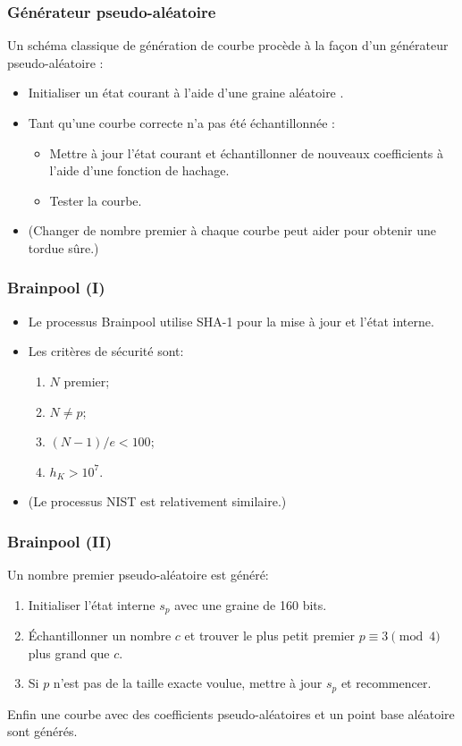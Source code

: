 \documentclass[francais]{beamer}
\begin{document}
\begin{frame}\frametitle{Générateur pseudo-aléatoire}
Un schéma classique de génération de courbe procède à la façon d'un générateur pseudo-aléatoire :
\begin{itemize}
\item Initialiser un état courant à l'aide d'une graine \og aléatoire \fg.
\item Tant qu'une courbe correcte n'a pas été échantillonnée :
\begin{itemize}
\item Mettre à jour l'état courant et échantillonner de nouveaux coefficients à l'aide d'une fonction de hachage.
\item Tester la courbe.
\end{itemize}
\item (Changer de nombre premier à chaque courbe peut aider pour obtenir une tordue sûre.)
\end{itemize}
\end{frame}

\begin{frame}\frametitle{Brainpool (I)}

\begin{itemize}
\item Le processus Brainpool utilise SHA-1 pour la mise à jour et l'état interne.

\bigskip

\item Les critères de sécurité sont:
\begin{enumerate}
\item $N$ premier;
\item $N \neq p$;
\item $(N-1)/e < 100$;
\item $h_K > 10^7$.
\end{enumerate}

\bigskip

\item (Le processus NIST est relativement similaire.)
\end{itemize}
\end{frame}

\begin{frame}\frametitle{Brainpool (II)}
Un nombre premier pseudo-aléatoire est généré:
\begin{enumerate}
\item Initialiser l'état interne $s_p$ avec une  graine de 160 bits.
\item Échantillonner un nombre $c$ et trouver le plus petit premier $p \equiv 3 \pmod{4}$ plus grand que $c$.
\item Si $p$ n'est pas de la taille exacte voulue, mettre à jour $s_p$ et recommencer.
\end{enumerate}

Enfin une courbe avec des coefficients pseudo-aléatoires
et un point base aléatoire sont générés.
\end{frame}
\end{document}
